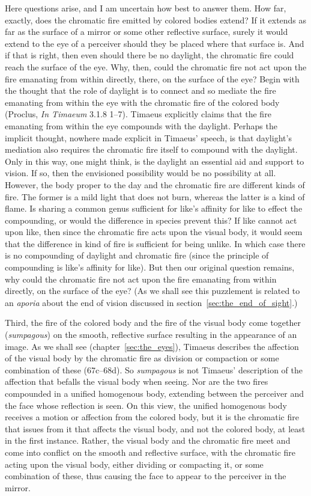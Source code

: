 Here questions arise, and I am uncertain how best to answer them. How far, exactly, does the chromatic fire emitted by colored bodies extend? If it extends as far as the surface of a mirror or some other reflective surface, surely it would extend to the eye of a perceiver should they be placed where that surface is. And if that is right, then even should there be no daylight, the chromatic fire could reach the surface of the eye. Why, then, could the chromatic fire not act upon the fire emanating from within directly, there, on the surface of the eye? Begin with the thought that the role of daylight is to connect and so mediate the fire emanating from within the eye with the chromatic fire of the colored body (Proclus, \emph{In Timaeum} 3.1.8 1--7). Timaeus explicitly claims that the fire emanating from within the eye compounds with the daylight. Perhaps the implicit thought, nowhere made explicit in Timaeus' speech, is that daylight's mediation also requires the chromatic fire itself to compound with the daylight. Only in this way, one might think, is the daylight an essential aid and support to vision. If so, then the envisioned possibility would be no possibility at all. However, the body proper to the day and the chromatic fire are different kinds of fire. The former is a mild light that does not burn, whereas the latter is a kind of flame. Is sharing a common genus sufficient for like's affinity for like to effect the compounding, or would the difference in species prevent this? If like cannot act upon like, then since the chromatic fire acts upon the visual body, it would seem that the difference in kind of fire is sufficient for being unlike. In which case there is no compounding of daylight and chromatic fire (since the principle of compounding is like's affinity for like). But then our original question remains, why could the chromatic fire not act upon the fire emanating from within directly, on the surface of the eye? (As we shall see this puzzlement is related to an \emph{aporia} about the end of vision discussed in section~\ref{sec:the_end_of_sight}.)

Third, the fire of the colored body and the fire of the visual body come together (\emph{sumpagous}) on the smooth, reflective surface resulting in the appearance of an image. As we shall see (chapter~\ref{sec:the_eyes}), Timaeus describes the affection of the visual body by the chromatic fire as division  or compaction or some combination of these (67c–68d). So \emph{sumpagous} is not Timaeus' description of the affection that befalls the visual body when seeing. Nor are the two fires compounded in a unified homogenous body, extending between the perceiver and the face whose reflection is seen. On this view, the unified homogenous body receives a motion or affection from the colored body, but it is the chromatic fire that issues from it that affects the visual body, and not the colored body, at least in the first instance.  Rather, the visual body and the chromatic fire meet and come into conflict on the smooth and reflective surface, with the chromatic fire acting upon the visual body, either dividing or compacting it, or some combination of these, thus causing the face to appear to the perceiver in the mirror.

